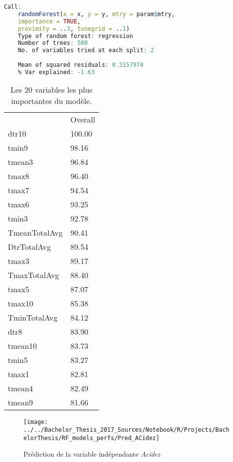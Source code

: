 \begin{minipage}{\linewidth}
	
	\begin{lstlisting}[showstringspaces=false,language=R, caption={Test du modèle de classification},captionpos=b]
	Call:
	randomForest(x = x, y = y, mtry = param$mtry, 
	importance = TRUE,      
	proximity = ..3, tunegrid = ..1) 
	Type of random forest: regression
	Number of trees: 500
	No. of variables tried at each split: 2
	
	Mean of squared residuals: 0.3157974
	% Var explained: -1.63
	\end{lstlisting}
\end{minipage}


\begin{table}[H]
	\centering
	\caption{Les 20 variables les plus importantes du modèle.}
	\label{RF_Acidez_Varimp}
	\begin{tabular}{ll}
	 & Overall \\
	 dtr10         & 100.00  \\
	 tmin9         & 98.16   \\
	 tmean3        & 96.84   \\
	 tmax8         & 96.40   \\
	 tmax7         & 94.54   \\
	 tmax6         & 93.25   \\
	 tmin3         & 92.78   \\
	 TmeanTotalAvg & 90.41   \\
	 DtrTotalAvg   & 89.54   \\
	 tmax3         & 89.17   \\
	 TmaxTotalAvg  & 88.40   \\
	 tmax5         & 87.07   \\
	 tmax10        & 85.38   \\
	 TminTotalAvg  & 84.12   \\
	 dtr8          & 83.90   \\
	 tmean10       & 83.73   \\
	 tmin5         & 83.27   \\
	 tmax1         & 82.81   \\
	 tmean4        & 82.49   \\
	 tmean9        & 81.66  
	\end{tabular}
\end{table}

\begin{figure}[H]
	\centering
	\texttt{[image: ../../Bachelor\_Thesis\_2017\_Sources/Notebook/R/Projects/BachelorThesis/RF\_models\_perfs/Pred\_ACidez]}
	\caption{Prédiction de la variable indépendante \textit{Acidez}}
	\label{fig:predacidez}
\end{figure}


